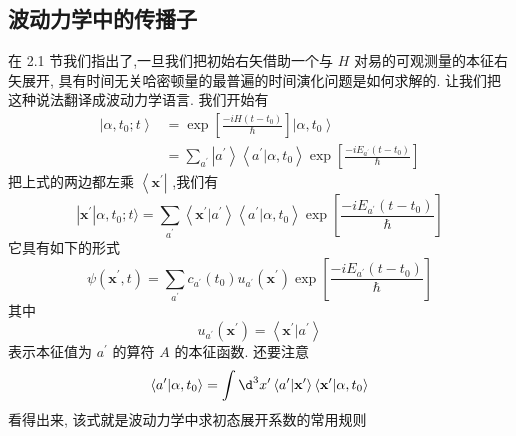 \documentclass[lang=cn,newtx,10pt,scheme=chinese,thmcnt=section]{elegantbook}
\begin{document}
\subsection*{波动力学中的传播子}
在 2.1 节我们指出了,一旦我们把初始右矢借助一个与 $H$ 对易的可观测量的本征右矢展开, 具有时间无关哈密顿量的最普遍的时间演化问题是如何求解的. 让我们把这种说法翻译成波动力学语言. 我们开始有
\begin{equation}
	\begin{aligned}
		\left| {\alpha ,{t}_{0};t}\right\rangle &= \exp \left\lbrack \frac{-{iH}\left( {t - {t}_{0}}\right) }{\hbar }\right\rbrack \left| {\alpha ,{t}_{0}}\right\rangle\\
		&= \mathop{\sum }\limits_{{a}^{\prime }}\left| {a}^{\prime }\right\rangle \left\langle {{a}^{\prime } | \alpha ,{t}_{0}}\right\rangle \exp \left\lbrack \frac{-i{E}_{{a}^{\prime }}\left( {t - {t}_{0}}\right) }{\hbar }\right\rbrack
	\end{aligned}
\end{equation}
把上式的两边都左乘 $\left\langle {\mathbf{x}}^{\prime }\right|$ ,我们有
\begin{equation}
	\left| {\mathbf{x}}^{\prime }\right| \alpha ,{t}_{0};t\rangle = \mathop{\sum }\limits_{{a}^{\prime }}\left\langle {{\mathbf{x}}^{\prime } | {a}^{\prime }}\right\rangle \left\langle {{a}^{\prime } | \alpha ,{t}_{0}}\right\rangle \exp \left\lbrack \frac{-i{E}_{{a}^{\prime }}\left( {t - {t}_{0}}\right) }{\hbar }\right\rbrack
\end{equation}
它具有如下的形式
\begin{equation}
	\psi \left( {{\mathbf{x}}^{\prime }, t}\right) = \mathop{\sum }\limits_{{a}^{\prime }}{c}_{{a}^{\prime }}\left( {t}_{0}\right) {u}_{{a}^{\prime }}\left( {\mathbf{x}}^{\prime }\right) \exp \left\lbrack \frac{-i{E}_{{a}^{\prime }}\left( {t - {t}_{0}}\right) }{\hbar }\right\rbrack
\end{equation}
其中
\begin{equation}
	{u}_{{a}^{\prime }}\left( {\mathbf{x}}^{\prime }\right) = \left\langle {{\mathbf{x}}^{\prime } | {a}^{\prime }}\right\rangle
\end{equation}
表示本征值为 ${a}^{\prime }$ 的算符 $A$ 的本征函数. 还要注意
\begin{equation}
	\left\langle {{a}^{\prime } | \alpha ,{t}_{0}}\right\rangle = \int {\d}^{3}{x}^{\prime }\left\langle {{a}^{\prime } | {\mathbf{x}}^{\prime }}\right\rangle \left\langle {{\mathbf{x}}^{\prime } | \alpha ,{t}_{0}}\right\rangle
\end{equation}
看得出来, 该式就是波动力学中求初态展开系数的常用规则
\end{document}
